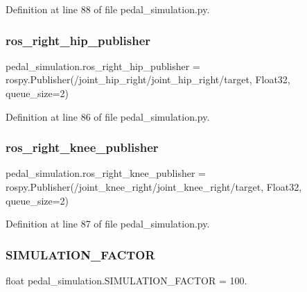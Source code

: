 Definition at line 88 of file pedal\+\_\+simulation.\+py.

\mbox{\label{namespacepedal__simulation_ad3c9df24a0162182eaa313ba9db6c8d5}} 
\subsubsection{\texorpdfstring{ros\_right\_hip\_publisher}{ros\_right\_hip\_publisher}}
{\footnotesize\ttfamily pedal\+\_\+simulation.\+ros\+\_\+right\+\_\+hip\+\_\+publisher = rospy.\+Publisher(\textquotesingle{}/joint\+\_\+hip\+\_\+right/joint\+\_\+hip\+\_\+right/target\textquotesingle{}, Float32, queue\+\_\+size=2)}



Definition at line 86 of file pedal\+\_\+simulation.\+py.

\mbox{\label{namespacepedal__simulation_add24f7830d3bc483feb54783aa3e27a7}} 
\subsubsection{\texorpdfstring{ros\_right\_knee\_publisher}{ros\_right\_knee\_publisher}}
{\footnotesize\ttfamily pedal\+\_\+simulation.\+ros\+\_\+right\+\_\+knee\+\_\+publisher = rospy.\+Publisher(\textquotesingle{}/joint\+\_\+knee\+\_\+right/joint\+\_\+knee\+\_\+right/target\textquotesingle{}, Float32, queue\+\_\+size=2)}



Definition at line 87 of file pedal\+\_\+simulation.\+py.

\mbox{\label{namespacepedal__simulation_a4ab5f9730fed07a39036266b7569a11b}} 
\subsubsection{\texorpdfstring{SIMULATION\_FACTOR}{SIMULATION\_FACTOR}}
{\footnotesize\ttfamily float pedal\+\_\+simulation.\+S\+I\+M\+U\+L\+A\+T\+I\+O\+N\+\_\+\+F\+A\+C\+T\+OR = 100.}



